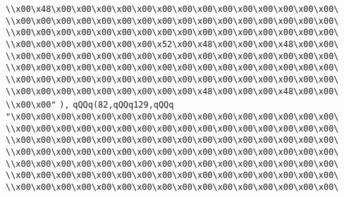 \verb|\\x00\x48\x00\x00\x00\x00\x00\x00\x00\x00\x00\x00\x00\x00\x00\x00\|\newline
\verb|\\x00\x00\x00\x00\x00\x00\x00\x00\x00\x00\x00\x00\x00\x00\x00\x00\|\newline
\verb|\\x00\x00\x00\x00\x00\x00\x00\x00\x00\x00\x00\x00\x00\x00\x00\x00\|\newline
\verb|\\x00\x00\x00\x00\x00\x00\x00\x52\x00\x48\x00\x00\x00\x48\x00\x00\|\newline
\verb|\\x00\x00\x00\x00\x00\x00\x00\x00\x00\x00\x00\x00\x00\x00\x00\x00\|\newline
\verb|\\x00\x00\x00\x00\x00\x00\x00\x00\x00\x00\x00\x00\x00\x00\x00\x00\|\newline
\verb|\\x00\x00\x00\x00\x00\x00\x00\x00\x00\x00\x00\x00\x00\x00\x00\x00\|\newline
\verb|\\x00\x00\x00\x00\x00\x00\x00\x00\x00\x48\x00\x00\x00\x48\x00\x00\|\newline
\verb|\\x00\x00"|\newline
\verb|),|\newline
\verb|qQQq(82,qQQq129,qQQq|\newline
\verb|"\x00\x00\x00\x00\x00\x00\x00\x00\x00\x00\x00\x00\x00\x00\x00\x00\|\newline
\verb|\\x00\x00\x00\x00\x00\x00\x00\x00\x00\x00\x00\x00\x00\x00\x00\x00\|\newline
\verb|\\x00\x00\x00\x00\x00\x00\x00\x00\x00\x00\x00\x00\x00\x00\x00\x00\|\newline
\verb|\\x00\x00\x00\x00\x00\x00\x00\x00\x00\x00\x00\x00\x00\x00\x00\x00\|\newline
\verb|\\x00\x00\x00\x00\x00\x00\x00\x00\x00\x00\x00\x00\x00\x00\x00\x00\|\newline
\verb|\\x00\x00\x00\x00\x00\x00\x00\x00\x00\x00\x00\x00\x00\x00\x00\x00\|\newline
\verb|\\x00\x00\x00\x00\x00\x00\x00\x00\x00\x00\x00\x00\x00\x00\x00\x00\|\newline
